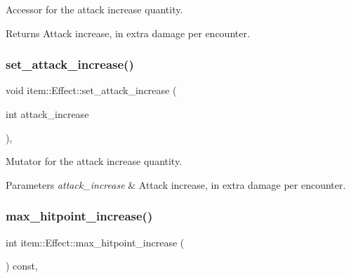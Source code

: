 Accessor for the attack increase quantity. 

\begin{DoxyReturn}{Returns}
Attack increase, in extra damage per encounter. 
\end{DoxyReturn}
\mbox{\label{classitem_1_1_effect_a0a98eb24f70970c00b95cfa0a40f6a6a}} 
\subsubsection{\texorpdfstring{set\+\_\+attack\+\_\+increase()}{set\_attack\_increase()}}
{\footnotesize\ttfamily void item\+::\+Effect\+::set\+\_\+attack\+\_\+increase (\begin{DoxyParamCaption}\item[{int}]{attack\+\_\+increase }\end{DoxyParamCaption})\hspace{0.3cm}{\ttfamily [inline]}, {\ttfamily [noexcept]}}



Mutator for the attack increase quantity. 


\begin{DoxyParams}{Parameters}
{\em attack\+\_\+increase} & Attack increase, in extra damage per encounter. \\
\hline
\end{DoxyParams}
\mbox{\label{classitem_1_1_effect_ad74a155925b8072030afabf3bb13ba4a}} 
\subsubsection{\texorpdfstring{max\+\_\+hitpoint\+\_\+increase()}{max\_hitpoint\_increase()}}
{\footnotesize\ttfamily int item\+::\+Effect\+::max\+\_\+hitpoint\+\_\+increase (\begin{DoxyParamCaption}{ }\end{DoxyParamCaption}) const\hspace{0.3cm}{\ttfamily [inline]}, {\ttfamily [noexcept]}}



